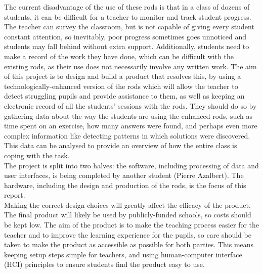 The current disadvantage of the use of these rods is that in a class of dozens of students, it can be difficult for a teacher to monitor and track student progress. The teacher can survey the classroom, but is not capable of giving every student constant attention, so inevitably, poor progress sometimes goes unnoticed and students may fall behind without extra support. Additionally, students need to make a record of the work they have done, which can be difficult with the existing rods, as their use does not necessarily involve any written work. The aim of this project is to design and build a product that resolves this, by using a technologically-enhanced version of the rods which will allow the teacher to detect struggling pupils and provide assistance to them, as well as keeping an electronic record of all the students' sessions with the rods. They should do so by gathering data about the way the students are using the enhanced rods, such as time spent on an exercise, how many answers were found, and perhaps even more complex information like detecting patterns in which solutions were discovered. This data can be analysed to provide an overview of how the entire class is coping with the task.\\

The project is split into two halves: the software, including processing of data and user interfaces, is being completed by another student (Pierre Azalbert). The hardware, including the design and production of the rods, is the focus of this report.\\


Making the correct design choices will greatly affect the efficacy of the product. The final product will likely be used by publicly-funded schools, so costs should be kept low. The aim of the product is to make the teaching process easier for the teacher and to improve the learning experience for the pupils, so care should be taken to make the product as accessible as possible for both parties. This means keeping setup steps simple for teachers, and using human-computer interface (HCI) principles to ensure students find the product easy to use.

